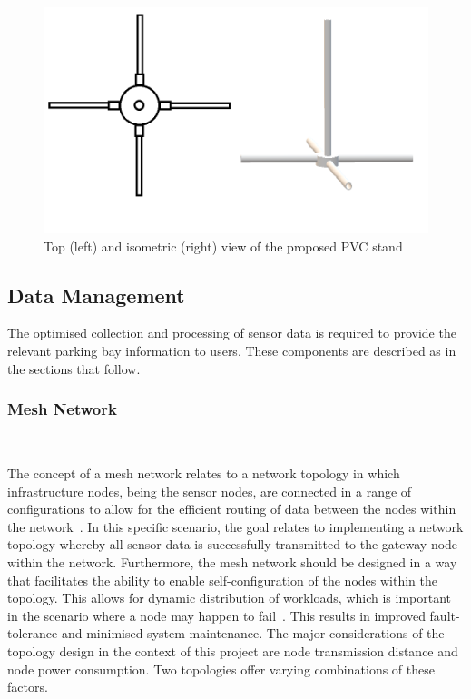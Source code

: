 \documentclass[10pt,twocolumn]{witseiepaper}
\begin{document}
		\begin{figure}
			\centering
			\includegraphics[width=1\columnwidth]{media/topIsoStand.png}
			\caption{Top (left) and isometric (right) view of the proposed PVC stand}
			\raggedright
			\label{fig:stand}
		\end{figure}
	
	\subsection{Data Management}
	
		The optimised collection and processing of sensor data is required to provide the relevant parking bay information to users. These components are described as in the sections that follow.
		
		\subsubsection{Mesh Network} $   $
		
			The concept of a mesh network relates to a network topology in which infrastructure nodes, being the sensor nodes, are connected in a range of configurations to allow for the efficient routing of data between the nodes within the network~\cite{mesh}. In this specific scenario, the goal relates to implementing a network topology whereby all sensor data is successfully transmitted to the gateway node within the network. Furthermore, the mesh network should be designed in a way that facilitates the ability to enable self-configuration of the nodes within the topology. This allows for dynamic distribution of workloads, which is important in the scenario where a node may happen to fail~\cite{mesh}. This results in improved fault-tolerance and minimised system maintenance. The major considerations of the topology design in the context of this project are node transmission distance and node power consumption. Two topologies offer varying combinations of these factors.
			
\end{document}
